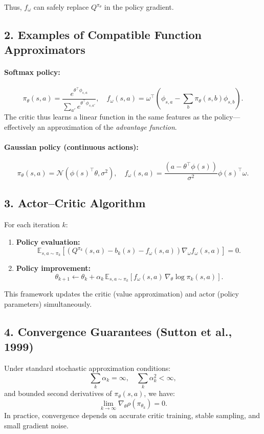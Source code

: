 \documentclass[12pt]{article}
\begin{document}
Thus, $f_\omega$ can safely replace $Q^{\pi_\theta}$ in the policy gradient.

\subsection*{2. Examples of Compatible Function Approximators}
\paragraph{Softmax policy:}
\[
		\pi_\theta(s,a) = \frac{e^{\theta^\top \phi_{s,a}}}{\sum_{a'} e^{\theta^\top \phi_{s,a'}}},
		\quad
		f_\omega(s,a) = \omega^\top (\phi_{s,a} - \sum_{b} \pi_\theta(s,b)\phi_{s,b}).
\]
The critic thus learns a linear function in the same features as the policy—effectively
an approximation of the \emph{advantage function}.

\paragraph{Gaussian policy (continuous actions):}
\[
		\pi_\theta(s,a) = \mathcal{N}(\phi(s)^\top \theta, \sigma^2), \quad
		f_\omega(s,a) = \frac{(a - \theta^\top \phi(s))}{\sigma^2}\phi(s)^\top \omega.
\]

\subsection*{3. Actor--Critic Algorithm}
For each iteration $k$:
\begin{enumerate}
		\item \textbf{Policy evaluation:}
    \[
						\mathbb{E}_{s,a \sim \pi_k}\!\left[(Q^{\pi_k}(s,a) - b_k(s) - f_\omega(s,a))
						\nabla_\omega f_\omega(s,a)\right] = 0.
    \]
		\item \textbf{Policy improvement:}
    \[
						\theta_{k+1} \leftarrow \theta_k + \alpha_k \,
						\mathbb{E}_{s,a \sim \pi_k}\!\left[f_\omega(s,a)\,\nabla_\theta \log \pi_k(s,a)\right].
    \]
\end{enumerate}
This framework updates the critic (value approximation) and actor (policy parameters)
simultaneously.

\subsection*{4. Convergence Guarantees (Sutton et al., 1999)}
Under standard stochastic approximation conditions:
\[
		\sum_k \alpha_k = \infty, \quad \sum_k \alpha_k^2 < \infty,
\]
and bounded second derivatives of $\pi_\theta(s,a)$, we have:
\[
		\lim_{k \to \infty} \nabla_\theta \rho(\pi_{\theta_k}) = 0.
\]
In practice, convergence depends on accurate critic training, stable sampling, and small
gradient noise.
\end{document}
